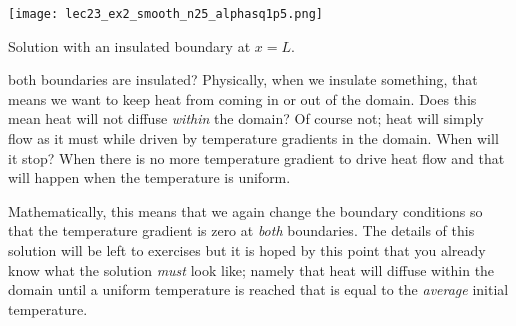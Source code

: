 \begin{marginfigure}
\texttt{[image: lec23\_ex2\_smooth\_n25\_alphasq1p5.png]}
\caption{Solution with an insulated boundary at $x=L$.}
\label{fig:lec23-ex2-n25}
\end{marginfigure}

 both boundaries are insulated?  Physically, when we insulate something, that means we want to keep heat from coming in or out of the domain.  Does this mean heat will not diffuse \emph{within} the domain?  Of course not; heat will simply flow as it must while driven by temperature gradients in the domain.  When will it stop?  When there is no more temperature gradient to drive heat flow and that will happen when the temperature is uniform.  

Mathematically, this means that we again change the boundary conditions so that the temperature gradient is zero at \emph{both} boundaries.  The details of this solution will be left to exercises but it is hoped by this point that you already know what the solution \emph{must} look like; namely that heat will diffuse within the domain until a uniform temperature is reached that is equal to the \emph{average} initial temperature.
